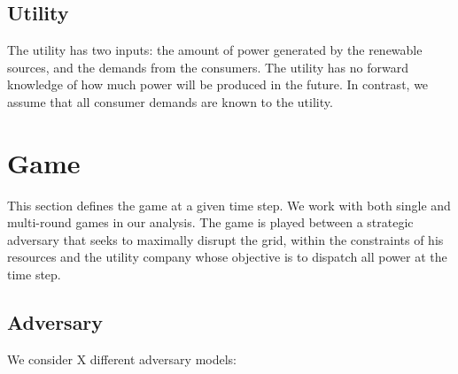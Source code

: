 \documentclass[conference]{IEEEtran}
\begin{document}
\subsection{Utility}

The utility has two inputs: the amount of power generated by the renewable sources, and the demands from the consumers.  The utility has no forward knowledge of how much power will be produced in the future.  In contrast, we assume that all consumer demands are known to the utility.  

\section{Game}

This section defines the game at a given time step.  We work with both single and multi-round games in our analysis.
The game is played between a strategic adversary that seeks to maximally disrupt the grid, within the constraints of his
resources and the utility company whose objective is to dispatch all power at the time step.   

\subsection{Adversary}

We consider X different adversary models:
\end{document}
